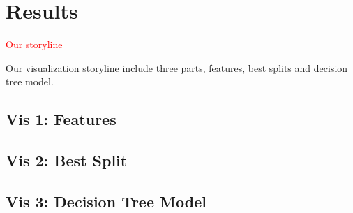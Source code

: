 \section{Results}
\label{sec:results} 

\textcolor{red}{Our storyline}

Our visualization storyline include three parts, features, best splits and decision tree model. 

\subsection{Vis 1: Features}

\subsection{Vis 2: Best Split}

\subsection{Vis 3: Decision Tree Model}

